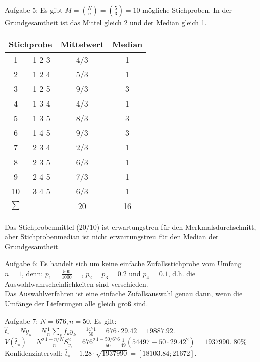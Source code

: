 \begin{Solution}{{Aufgabe 5:}}
Es gibt $M=\binom{N}{n} = \binom{5}{3} = 10$ mögliche Stichproben. In der Grundgesamtheit ist das Mittel gleich 2 und der Median gleich 1.
\begin{center}
\begin{tabular}{|c|c|c|c|}
	\hline
	\multicolumn{2}{|c|}{Stichprobe} & Mittelwert & Median \\
	\hline
	1 & 1 2 3 & 4/3 & 1 \\
	\hline
	2 & 1 2 4 & 5/3 & 1 \\
	\hline
	3 & 1 2 5 & 9/3 & 3 \\
	\hline
	4 & 1 3 4 & 4/3 & 1 \\
	\hline
	5 & 1 3 5 & 8/3 & 3 \\
	\hline
	6 & 1 4 5 & 9/3 & 3 \\
	\hline
	7 & 2 3 4 & 2/3 & 1 \\
	\hline
	8 & 2 3 5 & 6/3 & 1 \\
	\hline
	9 & 2 4 5 & 7/3 & 1 \\
	\hline
	10 & 3 4 5 & 6/3 & 1 \\
	\hline
	$\sum$ &  & 20 & 16 \\
	\hline
\end{tabular}
\end{center}
Das Stichprobenmittel (20/10) ist erwartungstreu für den Merkmalsdurchschnitt, aber Stichprobenmedian ist nicht erwartungstreu für den Median der Grundgesamtheit.
\end{Solution}
\begin{Solution}{{Aufgabe 6:}}
Es handelt sich um keine einfache Zufallsstichprobe vom Umfang $n=1$, denn: $p_1=\frac{500}{1000}=$, $p_2=p_3=0.2$ und $p_4=0.1$, d.h. die Auswahlwahrscheinlichkeiten sind verschieden.\\
Das Auswahlverfahren ist eine einfache Zufallsauswahl genau dann, wenn die Umfänge der Lieferungen alle gleich groß sind.
\end{Solution}
\begin{Solution}{{Aufgabe 7:}}
	$N=676, n=50$. Es gilt: $\hat{t}_\pi = N \bar{y}_s = N\frac{1}{n} \sum_s f_k y_k = \frac{1471}{50} = 676 \cdot 29.42 = 19887.92$.
	$V(\hat{t}_\pi) = N^2 \frac{1-n/N}{n} S_{y_s}^2= 676^2 \frac{1-50/676}{50} \frac{1}{49}(54497-50 \cdot 29.42^2) = 1937990$. 80\% Konfidenzintervall: $\hat{t}_\pi \pm 1.28 \cdot \sqrt{1937990} = [18103.84;21672]$.
\end{Solution}
